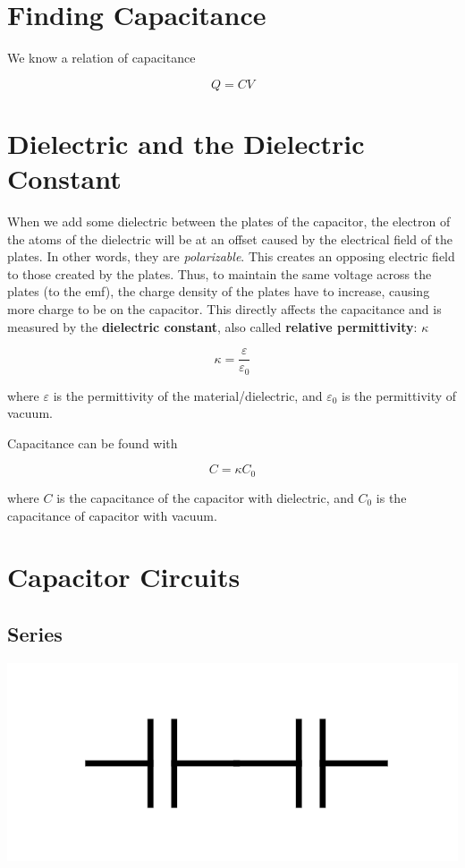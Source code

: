 \section{Finding Capacitance}

We know a relation of capacitance

\[Q = CV\]



\section{Dielectric and the Dielectric Constant}

When we add some dielectric between the plates of the capacitor, the electron of the atoms of the dielectric will be at an offset caused by the electrical field of the plates. In other words, they are \textit{polarizable}. This creates an opposing electric field to those created by the plates. Thus, to maintain the same voltage across the plates (to the emf), the charge density of the plates have to increase, causing more charge to be on the capacitor. This directly affects the capacitance and is measured by the \textbf{dielectric constant}, also called \textbf{relative permittivity}: $\kappa$

\[\kappa = \frac{\varepsilon}{\varepsilon_0}\]

where $\varepsilon$ is the permittivity of the material/dielectric, and $\varepsilon_0$ is the permittivity of vacuum.

Capacitance can be found with

\[C = \kappa C_0\]

where $C$ is the capacitance of the capacitor with dielectric, and $C_0$ is the capacitance of capacitor with vacuum.

\section{Capacitor Circuits}

\subsection{Series}

\hfil \includegraphics[scale=0.35]{assets/c-series.png}

